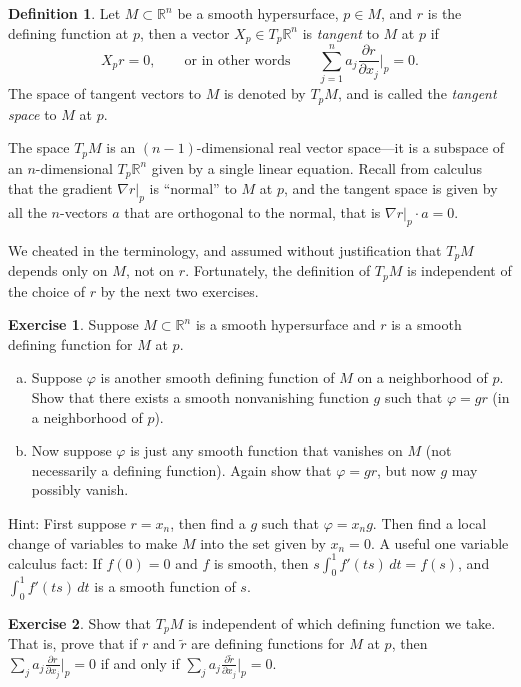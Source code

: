 \documentclass[12pt,openany]{book}
\newcommand{\R}{{\mathbb{R}}}
\newcommand{\myindex}[1]{#1\index{#1}}
\theoremstyle{plain}
\theoremstyle{remark}
\theoremstyle{definition}
\newtheorem{defn}[thm]{Definition}
\newenvironment{exbox}{%
    \def\FrameCommand{\vrule width 1pt \relax\hspace {10pt}}%
    \MakeFramed {\advance \hsize -\width \FrameRestore }%
}{%
    \endMakeFramed
}
\newenvironment{exparts}{%
    \leavevmode\begin{enumerate}[a),noitemsep,topsep=0pt,parsep=0pt,partopsep=0pt]
}{%
    \end{enumerate}
}
\theoremstyle{exercise}
\newtheorem{exercise}{Exercise}[section]
\theoremstyle{example}
\begin{document}
\begin{defn}
Let $M \subset \R^n$ be a smooth hypersurface,
$p \in M$, and $r$ is the defining function at $p$,
then a vector $X_p \in T_p \R^n$ is \emph{tangent}
to $M$ at $p$ if
\begin{equation*}
X_p r = 0, \qquad \text{or in other words} \qquad
\sum_{j=1}^n a_j \frac{\partial r}{\partial x_j} \Big|_p = 0 .
\end{equation*}
%
The space of tangent vectors to $M$ is denoted by $T_p M$, and
is called the \emph{\myindex{tangent space}} to $M$ at $p$.
\end{defn}

The space $T_pM$ is an $(n-1)$-dimensional real vector space---it is a subspace
of an $n$-dimensional $T_p\R^n$ given by a single linear equation.  
Recall from calculus that the gradient $\nabla r|_p$ is
``normal'' to $M$ at $p$, and
the tangent space is given by all the $n$-vectors $a$
that are orthogonal to the normal, that is $\nabla r|_p \cdot a = 0$.

We cheated in the terminology, and assumed without justification that $T_pM$
depends only on $M$, not on $r$.
Fortunately, the definition of $T_pM$ is independent of the choice of $r$ by the next two
exercises.

\pagebreak[2]
\begin{exbox}
\begin{exercise} \label{exercise:smoothdivision}
Suppose $M \subset \R^n$ is a smooth hypersurface and
$r$ is a smooth defining function for $M$ at $p$.
\begin{exparts}
\item
Suppose $\varphi$ is another
smooth defining function of $M$ on a neighborhood of $p$.
Show that there exists a smooth nonvanishing function $g$ such that
$\varphi = g r$ (in a neighborhood of $p$).
\item
Now suppose $\varphi$ is just any smooth function that vanishes on $M$ (not
necessarily a defining function).
Again show that $\varphi = g r$, but now $g$ may possibly vanish.
\end{exparts}
\nopagebreak
Hint: First suppose $r=x_n$, then %
find a $g$ such that $\varphi = x_n g$.  Then find
a local change of variables to make $M$ into the set given by $x_n = 0$.
A useful one variable calculus fact:
If $f(0) = 0$ and $f$ is smooth, then
$s \int_0^1 f'(ts) \,dt = f(s)$,
and $\int_0^1 f'(ts) \,dt$ is a smooth function of $s$.
\pagebreak[2]
\end{exercise}

\begin{exercise}
Show that $T_pM$ is independent of which defining function we take.  That
is,
prove that if $r$ and $\tilde{r}$ are defining functions for $M$ at $p$, then
$\sum_j a_j \frac{\partial r}{\partial x_j} \Big|_p = 0$
if and only if
$\sum_j a_j \frac{\partial \tilde{r}}{\partial x_j} \Big|_p = 0$.
\end{exercise}
\end{exbox}
\end{document}
